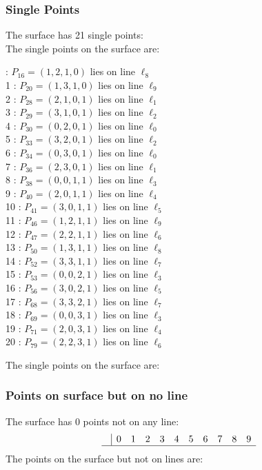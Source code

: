 \documentclass{article}
\begin{document}
{\subsubsection*{Single Points}
The surface has 21 single points:\\
The single points on the surface are:\\
\begin{multicols}{2}
 : $P_{16}=( 1, 2, 1, 0 )$ lies on line $\ell_{8}$\\
1 : $P_{20}=( 1, 3, 1, 0 )$ lies on line $\ell_{9}$\\
2 : $P_{28}=( 2, 1, 0, 1 )$ lies on line $\ell_{1}$\\
3 : $P_{29}=( 3, 1, 0, 1 )$ lies on line $\ell_{2}$\\
4 : $P_{30}=( 0, 2, 0, 1 )$ lies on line $\ell_{0}$\\
5 : $P_{33}=( 3, 2, 0, 1 )$ lies on line $\ell_{2}$\\
6 : $P_{34}=( 0, 3, 0, 1 )$ lies on line $\ell_{0}$\\
7 : $P_{36}=( 2, 3, 0, 1 )$ lies on line $\ell_{1}$\\
8 : $P_{38}=( 0, 0, 1, 1 )$ lies on line $\ell_{3}$\\
9 : $P_{40}=( 2, 0, 1, 1 )$ lies on line $\ell_{4}$\\
10 : $P_{41}=( 3, 0, 1, 1 )$ lies on line $\ell_{5}$\\
11 : $P_{46}=( 1, 2, 1, 1 )$ lies on line $\ell_{9}$\\
12 : $P_{47}=( 2, 2, 1, 1 )$ lies on line $\ell_{6}$\\
13 : $P_{50}=( 1, 3, 1, 1 )$ lies on line $\ell_{8}$\\
14 : $P_{52}=( 3, 3, 1, 1 )$ lies on line $\ell_{7}$\\
15 : $P_{53}=( 0, 0, 2, 1 )$ lies on line $\ell_{3}$\\
16 : $P_{56}=( 3, 0, 2, 1 )$ lies on line $\ell_{5}$\\
17 : $P_{68}=( 3, 3, 2, 1 )$ lies on line $\ell_{7}$\\
18 : $P_{69}=( 0, 0, 3, 1 )$ lies on line $\ell_{3}$\\
19 : $P_{71}=( 2, 0, 3, 1 )$ lies on line $\ell_{4}$\\
20 : $P_{79}=( 2, 2, 3, 1 )$ lies on line $\ell_{6}$\\
\end{multicols}
The single points on the surface are:\\
\subsubsection*{Points on surface but on no line}
The surface has 0 points not on any line:\\
$$
\begin{array}{r|*{10}{r}}
 & 0 & 1 & 2 & 3 & 4 & 5 & 6 & 7 & 8 & 9\\
\hline
\end{array}
$$
The points on the surface but not on lines are:\\
\begin{multicols}{2}
\noindent
\end{multicols}
}
\end{document}
